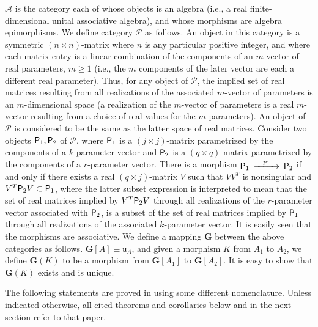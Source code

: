 \documentclass{amsart}
\numberwithin{equation}{section}
\theoremstyle{definition}
\numberwithin{theorem}{section}
\begin{document}
$\mathcal{A}$ is the category each of whose objects is an algebra (i.e., a real finite-dimensional unital associative algebra), and whose morphisms are algebra epimorphisms.  We define category $\mathcal{P}$ as follows. An object in this category is a symmetric $(n\times n)$-matrix where $n$ is any particular positive integer, and where each matrix entry is a linear combination of the components of an $m$-vector of real parameters, $m\ge 1$ (i.e., the $m$ components of the later vector are each a different real parameter).  Thus, for any object of $\mathcal{P}$, the implied set of real matrices resulting from all realizations of the associated $m$-vector of parameters is an $m$-dimensional space (a realization of the $m$-vector of parameters is a real $m$-vector resulting from a choice of real values for the $m$ parameters).  An object of $\mathcal{P}$ is considered to be the same as the latter space of real matrices.  Consider two objects ${\sf P}_1,{\sf P}_2$ of $\mathcal{P}$, where ${\sf P}_1$ is a $(j\times j)$-matrix parametrized by the components of a $k$-parameter vector and ${\sf P}_2$ is a $(q\times q)$-matrix parametrized by the components of a $r$-parameter vector.  There is a morphism $ \begin{CD}  {\sf P}_1 @>p_1>> {\sf P}_2\end{CD}$ if and only if  there exists a real $(q\times j)$-matrix $V$ such that $VV^T$ is nonsingular and $V^T{\sf P}_2V\subset {\sf P}_1$, where the latter subset expression 
is interpreted to mean that the set of real matrices implied by $V^T{\sf P}_2V$ through all realizations of the $r$-parameter vector associated with ${\sf P}_2$, is a subset of  the set of real matrices implied by  ${\sf P}_1$ through all realizations of the associated $k$-parameter vector.  It is easily seen that the morphisms are associative.  We define a mapping $\mathbf{G}$ between the above categories as follows.  $\mathbf{G}[
A] \equiv \mathfrak{u}_A$, and given a morphism $K$ from $A_1$ to $A_2$, we define $\mathbf{G}(K)$ to be a morphism from $\mathbf{G}[A_1]$ to $\mathbf{G}[A_2]$.  It is easy to show that $\mathbf{G}(K)$ exists and is unique.

 The following statements are proved in \cite{fgreensite:2023} using some different nomenclature.  Unless indicated otherwise, all cited theorems and corollaries below and in the next section refer to that paper.
\end{document}
